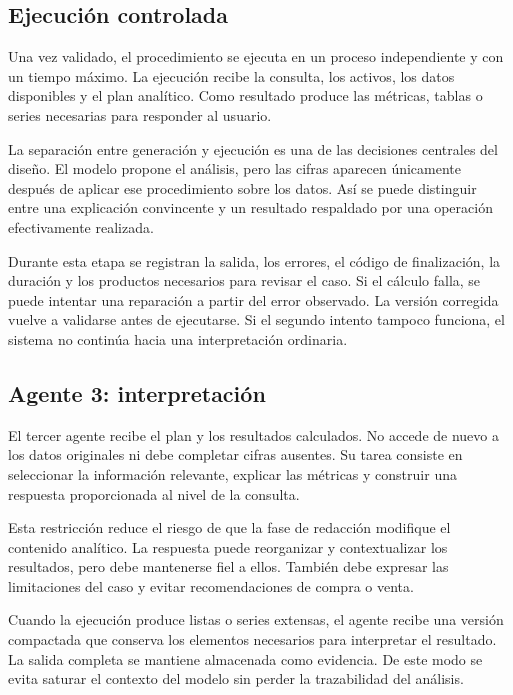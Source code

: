 \subsection{Ejecución controlada}

Una vez validado, el procedimiento se ejecuta en un proceso independiente y con un tiempo máximo. La ejecución recibe la consulta, los activos, los datos disponibles y el plan analítico. Como resultado produce las métricas, tablas o series necesarias para responder al usuario.

La separación entre generación y ejecución es una de las decisiones centrales del diseño. El modelo propone el análisis, pero las cifras aparecen únicamente después de aplicar ese procedimiento sobre los datos. Así se puede distinguir entre una explicación convincente y un resultado respaldado por una operación efectivamente realizada.

Durante esta etapa se registran la salida, los errores, el código de finalización, la duración y los productos necesarios para revisar el caso. Si el cálculo falla, se puede intentar una reparación a partir del error observado. La versión corregida vuelve a validarse antes de ejecutarse. Si el segundo intento tampoco funciona, el sistema no continúa hacia una interpretación ordinaria.

\subsection{Agente 3: interpretación}

El tercer agente recibe el plan y los resultados calculados. No accede de nuevo a los datos originales ni debe completar cifras ausentes. Su tarea consiste en seleccionar la información relevante, explicar las métricas y construir una respuesta proporcionada al nivel de la consulta.

Esta restricción reduce el riesgo de que la fase de redacción modifique el contenido analítico. La respuesta puede reorganizar y contextualizar los resultados, pero debe mantenerse fiel a ellos. También debe expresar las limitaciones del caso y evitar recomendaciones de compra o venta.

Cuando la ejecución produce listas o series extensas, el agente recibe una versión compactada que conserva los elementos necesarios para interpretar el resultado. La salida completa se mantiene almacenada como evidencia. De este modo se evita saturar el contexto del modelo sin perder la trazabilidad del análisis.


